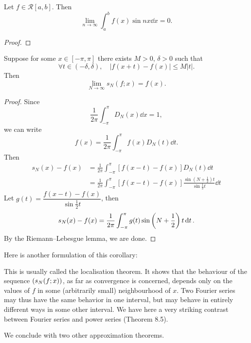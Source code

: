 \begin{proposition}
Let $f\in\mathcal{R}[a,b]$. Then
\begin{equation}
\lim_{n\to\infty}\int_{a}^{b}f(x)\sin nx\dd{x}=0.
\end{equation}
\end{proposition}

\begin{proof}

\end{proof}

\begin{proposition}
Suppose for some $x\in[-\pi,\pi]$ there exists $M>0$, $\delta>0$ such that
\[\forall t\in(-\delta,\delta),\quad|f(x+t)-f(x)|\le M|t|.\]
Then
\[\lim_{N\to\infty}s_N(f;x)=f(x).\]
\end{proposition}

\begin{proof}
Since
\[\frac{1}{2\pi}\int_{-\pi}^{\pi}D_N(x)\dd{x}=1,\]
we can write
\[f(x)=\frac{1}{2\pi}\int_{-\pi}^{\pi}f(x)D_N(t)\dd{t}.\]
Then
\begin{align*}
s_N(x)-f(x)
&=\frac{1}{2\pi}\int_{-\pi}^{\pi}[f(x-t)-f(x)]D_N(t)\dd{t}\\
&=\frac{1}{2\pi}\int_{-\pi}^{\pi}[f(x-t)-f(x)]\frac{\sin(N+\frac{1}{2})t}{\sin\frac{1}{2}t}\dd{t}
\end{align*}
Let $g(t)=\dfrac{f(x-t)-f(x)}{\sin\frac{1}{2}t}$, then
\[s_N(x)-f(x)=\frac{1}{2\pi}\int_{-\pi}^{\pi}g(t)\sin\left(N+\frac{1}{2}\right)t\dd{t}.\]
By the Riemann--Lebesgue lemma, we are done.
\end{proof}

\begin{corollary}

\end{corollary}

Here is another formulation of this corollary: 

This is usually called the localisation theorem. It shows that the behaviour of the sequence $\left(s_N(f;x)\right)$, as far as convergence is concerned, depends only on the values of $f$ in some (arbitrarily small) neighbourhood of $x$. Two Fourier series may thus have the same behavior in one interval, but may behave in entirely different ways in some other interval. We have here a very striking contrast between Fourier series and power series (Theorem 8.5).

We conclude with two other approximation theorems.

